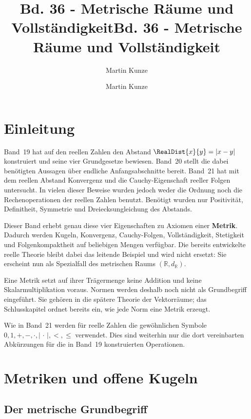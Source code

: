 \documentclass[main.tex]{subfiles}
\title{Bd. 36 - Metrische Räume und Vollständigkeit}
\author{Martin Kunze}
\date{}
\begin{document}
\title{Bd. 36 - Metrische Räume und Vollständigkeit}
\author{Martin Kunze}
\date{}
\hypersetup{pageanchor=false}
\maketitle
\hypersetup{pageanchor=true}
\setcounter{tocdepth}{3}
\tableofcontents
\setcounter{file}{36}
\renewcommand{\FormulaBandID}{36}

\chapter{Einleitung}

Band~19 hat auf den reellen Zahlen den Abstand
\(\RealDist{x}{y}=|x-y|\) konstruiert und seine vier Grundgesetze bewiesen.
Band~20 stellt die dabei benötigten Aussagen über endliche Anfangsabschnitte
bereit. Band~21 hat mit dem reellen Abstand Konvergenz und die
Cauchy-Eigenschaft reeller Folgen untersucht. In vielen dieser Beweise wurden
jedoch weder die Ordnung noch die Rechenoperationen der reellen Zahlen
benutzt. Benötigt wurden nur Positivität, Definitheit, Symmetrie und
Dreiecksungleichung des Abstands.

Dieser Band erhebt genau diese vier Eigenschaften zu Axiomen einer
\textbf{Metrik}. Dadurch werden Kugeln, Konvergenz, Cauchy-Folgen,
Vollständigkeit, Stetigkeit und Folgenkompaktheit auf beliebigen Mengen
verfügbar. Die bereits entwickelte reelle Theorie bleibt dabei das leitende
Beispiel und wird nicht ersetzt: Sie erscheint nun als Spezialfall des
metrischen Raums \((\mathbb R,d_{\mathbb R})\).

Eine Metrik setzt auf ihrer Trägermenge keine Addition und keine
Skalarmultiplikation voraus. Normen werden deshalb noch nicht als
Grundbegriff eingeführt. Sie gehören in die spätere Theorie der Vektorräume;
das Schlusskapitel ordnet bereits ein, wie jede Norm eine Metrik erzeugt.

Wie in Band~21 werden für reelle Zahlen die gewöhnlichen Symbole
\(0,1,+,-,\cdot,|\,\cdot\,|,<,\leq\) verwendet. Dies sind weiterhin nur die
dort vereinbarten Abkürzungen für die in Band~19 konstruierten Operationen.

\chapter{Metriken und offene Kugeln}

\section{Der metrische Grundbegriff}
\end{document}

